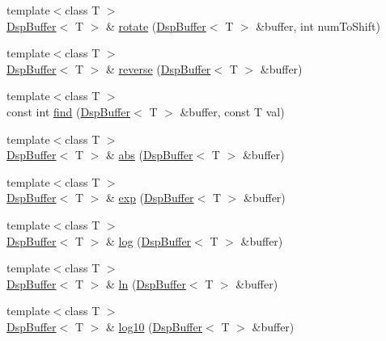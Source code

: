 \begin{DoxyCompactItemize}
\item 
{\footnotesize template$<$class T $>$ }\\\hyperlink{class_smart_dsp_1_1_dsp_buffer}{Dsp\+Buffer}$<$ T $>$ \& \hyperlink{namespace_smart_dsp_a41025441b05f8b7e6fa800f4058eb218}{rotate} (\hyperlink{class_smart_dsp_1_1_dsp_buffer}{Dsp\+Buffer}$<$ T $>$ \&buffer, int num\+To\+Shift)
\item 
{\footnotesize template$<$class T $>$ }\\\hyperlink{class_smart_dsp_1_1_dsp_buffer}{Dsp\+Buffer}$<$ T $>$ \& \hyperlink{namespace_smart_dsp_a898ec78f5aed80a817fc3ce4f6437135}{reverse} (\hyperlink{class_smart_dsp_1_1_dsp_buffer}{Dsp\+Buffer}$<$ T $>$ \&buffer)
\item 
{\footnotesize template$<$class T $>$ }\\const int \hyperlink{namespace_smart_dsp_a7e909f391d4acc196b5698f2fbe309d5}{find} (\hyperlink{class_smart_dsp_1_1_dsp_buffer}{Dsp\+Buffer}$<$ T $>$ \&buffer, const T val)
\item 
{\footnotesize template$<$class T $>$ }\\\hyperlink{class_smart_dsp_1_1_dsp_buffer}{Dsp\+Buffer}$<$ T $>$ \& \hyperlink{namespace_smart_dsp_ac41a08f05ef2cd4f8f353aca5dc77d16}{abs} (\hyperlink{class_smart_dsp_1_1_dsp_buffer}{Dsp\+Buffer}$<$ T $>$ \&buffer)
\item 
{\footnotesize template$<$class T $>$ }\\\hyperlink{class_smart_dsp_1_1_dsp_buffer}{Dsp\+Buffer}$<$ T $>$ \& \hyperlink{namespace_smart_dsp_ae66197346f7f03eb05186b384293c991}{exp} (\hyperlink{class_smart_dsp_1_1_dsp_buffer}{Dsp\+Buffer}$<$ T $>$ \&buffer)
\item 
{\footnotesize template$<$class T $>$ }\\\hyperlink{class_smart_dsp_1_1_dsp_buffer}{Dsp\+Buffer}$<$ T $>$ \& \hyperlink{namespace_smart_dsp_a35a9524f1d2452ee879d22b675facdd1}{log} (\hyperlink{class_smart_dsp_1_1_dsp_buffer}{Dsp\+Buffer}$<$ T $>$ \&buffer)
\item 
{\footnotesize template$<$class T $>$ }\\\hyperlink{class_smart_dsp_1_1_dsp_buffer}{Dsp\+Buffer}$<$ T $>$ \& \hyperlink{namespace_smart_dsp_acd1ff2a10b5997cfd5316ca3a6598278}{ln} (\hyperlink{class_smart_dsp_1_1_dsp_buffer}{Dsp\+Buffer}$<$ T $>$ \&buffer)
\item 
{\footnotesize template$<$class T $>$ }\\\hyperlink{class_smart_dsp_1_1_dsp_buffer}{Dsp\+Buffer}$<$ T $>$ \& \hyperlink{namespace_smart_dsp_ae14d84395f82f996b0ede6e845108c77}{log10} (\hyperlink{class_smart_dsp_1_1_dsp_buffer}{Dsp\+Buffer}$<$ T $>$ \&buffer)

\end{DoxyCompactItemize}
